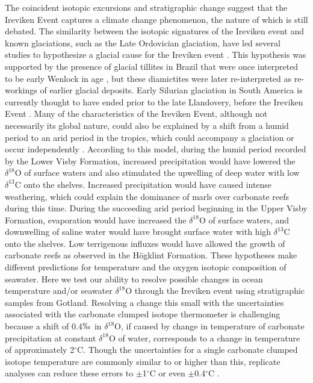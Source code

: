 \documentclass[preprint, authoryear]{elsarticle}
\begin{document}
The coincident isotopic excursions and stratigraphic change suggest that the Ireviken Event captures a climate change phenomenon, the nature of which is still debated. The similarity between the isotopic signatures of the Ireviken event and known glaciations, such as the Late Ordovician glaciation, have led several studies to hypothesize a glacial cause for the Ireviken event \citep{Azmy1998, Kaljo2003, Brand2006, Calner2008}. This hypothesis was supported by the presence of glacial tillites in Brazil that were once interpreted to be early Wenlock in age \citep{Grahn1992}, but these diamictites were later re-interpreted as re-workings of earlier glacial deposits. Early Silurian glaciation in South America is currently thought to have ended prior to the late Llandovery, before the Ireviken Event \citep{DiazMartinez2007a, DiazMartinez2007b}. Many of the characteristics of the Ireviken Event, although not necessarily its global nature, could also be explained by a shift from a humid period to an arid period in the tropics, which could accompany a glaciation or occur independently \citep{Bickert1997, Jeppsson1990, Munnecke2003, Samtleben1996}. According to this model, during the humid period recorded by the Lower Visby Formation, increased precipitation would have lowered the $\delta^{18}$O of surface waters and also stimulated the upwelling of deep water with low $\delta^{13}$C onto the shelves. Increased precipitation would have caused intense weathering, which could explain the dominance of marls over carbonate reefs during this time. During the succeeding arid period beginning in the Upper Visby Formation, evaporation would have increased the $\delta^{18}$O of surface waters, and downwelling of saline water would have brought surface water with high $\delta^{13}$C onto the shelves. Low terrigenous influxes would have allowed the growth of carbonate reefs as observed in the H\"{o}gklint Formation. These hypotheses make different predictions for temperature and the oxygen isotopic composition of seawater. Here we test our ability to resolve possible changes in ocean temperature and/or seawater $\delta^{18}$O through the Ireviken event using stratigraphic samples from Gotland. Resolving a change this small with the uncertainties associated with the carbonate clumped isotope thermometer is challenging because a shift of 0.4$\permil$ in $\delta^{18}$O, if caused by change in temperature of carbonate precipitation at constant $\delta^{18}$O of water, corresponds to a change in temperature of approximately 2$^{\circ}$C. Though the uncertainties for a single carbonate clumped isotope temperature are commonly similar to or higher than this, replicate analyses can reduce these errors to $\pm$1$^{\circ}$C or even $\pm$0.4$^{\circ}$C \citep{Thiagarajan2011}.
\end{document}
